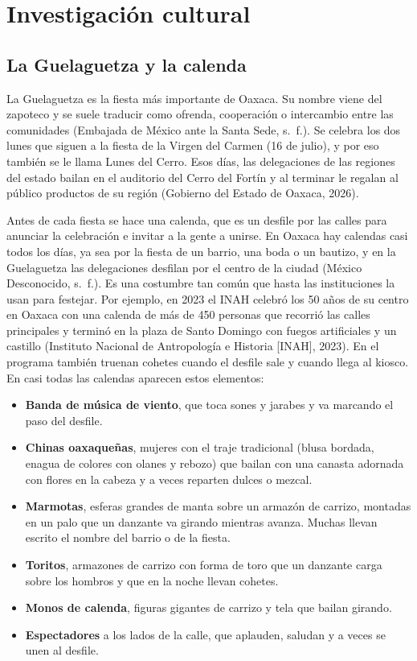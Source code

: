 \documentclass[11pt,a4paper]{article}
\begin{document}
\section{Investigación cultural}
\label{sec:cultura}

\subsection{La Guelaguetza y la calenda}

La Guelaguetza es la fiesta más importante de Oaxaca. Su nombre viene del zapoteco y se suele traducir como ofrenda, cooperación o intercambio entre las comunidades (Embajada de México ante la Santa Sede, s.~f.). Se celebra los dos lunes que siguen a la fiesta de la Virgen del Carmen (16 de julio), y por eso también se le llama Lunes del Cerro. Esos días, las delegaciones de las regiones del estado bailan en el auditorio del Cerro del Fortín y al terminar le regalan al público productos de su región (Gobierno del Estado de Oaxaca, 2026).

Antes de cada fiesta se hace una calenda, que es un desfile por las calles para anunciar la celebración e invitar a la gente a unirse. En Oaxaca hay calendas casi todos los días, ya sea por la fiesta de un barrio, una boda o un bautizo, y en la Guelaguetza las delegaciones desfilan por el centro de la ciudad (México Desconocido, s.~f.). Es una costumbre tan común que hasta las instituciones la usan para festejar. Por ejemplo, en 2023 el INAH celebró los 50 años de su centro en Oaxaca con una calenda de más de 450 personas que recorrió las calles principales y terminó en la plaza de Santo Domingo con fuegos artificiales y un castillo (Instituto Nacional de Antropología e Historia [INAH], 2023). En el programa también truenan cohetes cuando el desfile sale y cuando llega al kiosco. En casi todas las calendas aparecen estos elementos:

\begin{itemize}
  \item \textbf{Banda de música de viento}, que toca sones y jarabes y va marcando el paso del desfile.
  \item \textbf{Chinas oaxaqueñas}, mujeres con el traje tradicional (blusa bordada, enagua de colores con olanes y rebozo) que bailan con una canasta adornada con flores en la cabeza y a veces reparten dulces o mezcal.
  \item \textbf{Marmotas}, esferas grandes de manta sobre un armazón de carrizo, montadas en un palo que un danzante va girando mientras avanza. Muchas llevan escrito el nombre del barrio o de la fiesta.
  \item \textbf{Toritos}, armazones de carrizo con forma de toro que un danzante carga sobre los hombros y que en la noche llevan cohetes.
  \item \textbf{Monos de calenda}, figuras gigantes de carrizo y tela que bailan girando.
  \item \textbf{Espectadores} a los lados de la calle, que aplauden, saludan y a veces se unen al desfile.
\end{itemize}
\end{document}
